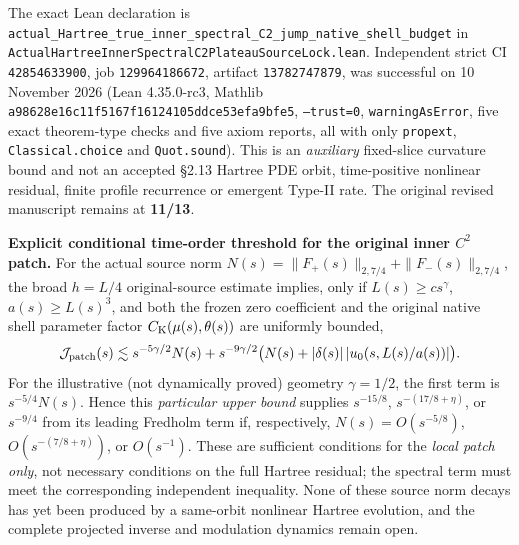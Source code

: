 \documentclass[11pt]{amsart}
\begin{document}
The exact Lean declaration is
\texttt{actual\_Hartree\_true\_inner\_spectral\_C2\_jump\_native\_shell\_budget}
in \texttt{ActualHartreeInnerSpectralC2PlateauSourceLock.lean}.
Independent strict CI \texttt{42854633900}, job
\texttt{129964186672}, artifact \texttt{13782747879},
was successful on 10 November 2026 (Lean 4.35.0-rc3,
Mathlib \texttt{a98628e16c11f5167f16124105ddce53efa9bfe5},
\texttt{--trust=0}, \texttt{warningAsError},
five exact theorem-type checks and five axiom reports, all with only
\texttt{propext}, \texttt{Classical.choice} and \texttt{Quot.sound}).
This is an \emph{auxiliary} fixed-slice curvature bound and not
an accepted §2.13 Hartree PDE orbit, time-positive nonlinear residual,
finite profile recurrence or emergent Type-II rate.
The original revised manuscript remains at \textbf{11/13}.

\medskip
\noindent\textbf{Explicit conditional time-order threshold for the
original inner $C^2$ patch.}
For the actual source norm
$N(s)=\|F_+(s)\|_{2,7/4}+\|F_-(s)\|_{2,7/4}$, the
broad $h=L/4$ original-source estimate implies, only if
$L(s)\ge cs^\gamma$, $a(s)\ge L(s)^3$, and both the frozen
zero coefficient and the original native shell parameter factor
$C_{\rm K}(\mu(s),\theta(s))$ are uniformly bounded,
\[
 {\mathcal J}_{\rm patch}(s)
 \lesssim s^{-5\gamma/2}N(s)
 +s^{-9\gamma/2}
   \bigl(N(s)+|\delta(s)|\,|u_0(s,L(s)/a(s))|\bigr).
\]
For the illustrative (not dynamically proved) geometry
$\gamma=1/2$, the first term is $s^{-5/4}N(s)$.
Hence this \emph{particular upper bound} supplies
$s^{-15/8}$, $s^{-(17/8+\eta)}$, or $s^{-9/4}$
from its leading Fredholm term if, respectively,
$N(s)=O(s^{-5/8})$, $O(s^{-(7/8+\eta)})$, or
$O(s^{-1})$.  These are sufficient conditions for the
\emph{local patch only}, not necessary conditions on
the full Hartree residual; the spectral term must meet
the corresponding independent inequality.  None of
these source norm decays has yet been produced by a
same-orbit nonlinear Hartree evolution, and the complete
projected inverse and modulation dynamics remain open.
\end{document}
